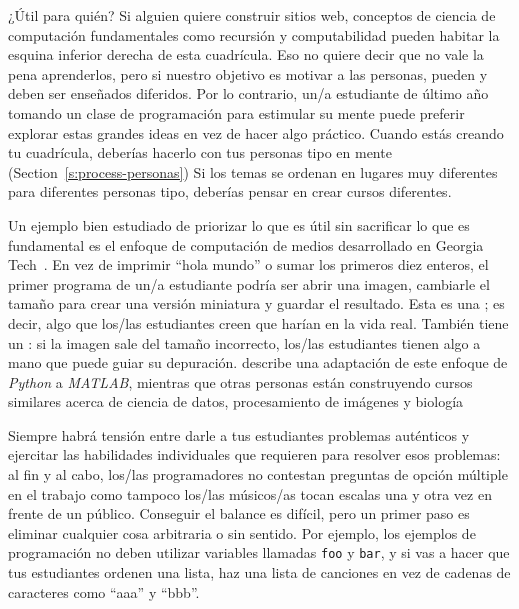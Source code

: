 \begin{aside}{¿Útil para quién?}
  Si alguien quiere construir sitios web,
  conceptos de ciencia de computación fundamentales como recursión y computabilidad
  pueden habitar la esquina inferior derecha de esta cuadrícula. 
  Eso no quiere decir que no vale la pena aprenderlos,
  pero si nuestro objetivo es motivar a las personas,
  pueden y deben ser enseñados diferidos.
  Por lo contrario,
  un/a estudiante de último año tomando un clase de programación para estimular su mente
  puede preferir explorar estas grandes ideas en vez de hacer algo práctico.
  Cuando estás creando tu cuadrícula,
  deberías hacerlo con tus personas tipo en mente
  (Section~\ref{s:process-personas})
  Si los temas se ordenan en lugares muy diferentes para diferentes personas tipo,
  deberías pensar en crear cursos diferentes.
\end{aside}

Un ejemplo bien estudiado de priorizar lo que es útil
sin sacrificar lo que es fundamental
es el enfoque de computación de medios desarrollado en Georgia Tech~\cite{Guzd2013}.
En vez de imprimir ``hola mundo'' o sumar los primeros diez enteros,
el primer programa de un/a estudiante podría ser abrir una imagen,
cambiarle el tamaño para crear una versión miniatura
y guardar el resultado.
Esta es una ; 
es decir, algo que los/las estudiantes creen que harían en la vida real.
También tiene un :
si la imagen sale del tamaño incorrecto,
los/las estudiantes tienen algo a mano que puede guiar su depuración.
\cite{Lee2013} describe una adaptación de este enfoque de \emph{Python} a \emph{MATLAB},
mientras que otras personas están construyendo cursos similares acerca de ciencia de datos, procesamiento de imágenes
y biología~\cite{Dahl2018,Meys2018,Ritz2018}

Siempre habrá tensión entre darle a tus estudiantes problemas auténticos
y ejercitar las habilidades individuales que requieren para resolver esos problemas:
al fin y al cabo,
los/las programadores no contestan preguntas de opción múltiple en el trabajo
como tampoco los/las músicos/as tocan escalas una y otra vez en frente de un público.
Conseguir el balance es difícil,
pero un primer paso es eliminar cualquier cosa arbitraria o sin sentido.
Por ejemplo,
los ejemplos de programación no deben utilizar variables llamadas \texttt{foo} y \texttt{bar},
y si vas a hacer que tus estudiantes ordenen una lista,
haz una lista de canciones en vez de cadenas de caracteres como ``aaa'' y ``bbb''.

